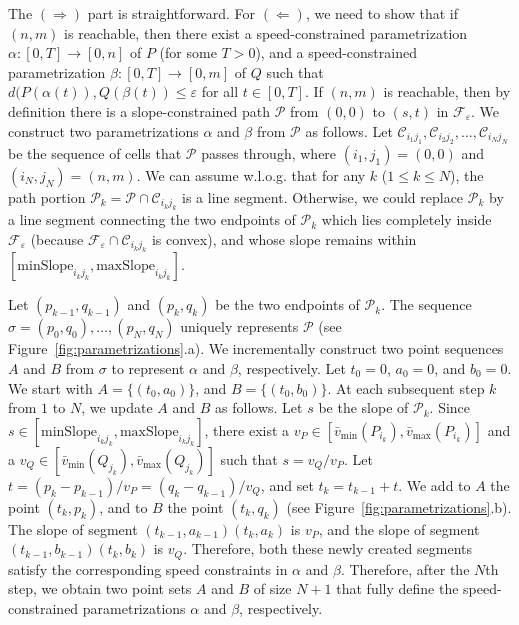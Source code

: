 \documentclass[12pt]{dalthesis}
\def\favoritefont{\bfseries \sffamily}
\def\QED{\ensuremath{{\Box}}}
\def\markatright#1{\leavevmode\unskip\nobreak\quad\hspace*{\fill}{#1}}
\newenvironment{proof}
	{\begin{trivlist}\item[\hskip\labelsep{\favoritefont Proof:}]}
	{\markatright{\QED}\end{trivlist}}
\newcommand{\lee}{\leqslant}
\newcommand{\set}[1]{{\{ #1 \}}}
\newcommand{\eps}{\varepsilon}
\newcommand{\CF}{{\mathscr F}}
\newcommand{\CP}{{\mathscr P}}
\newcommand{\CC}{{\mathscr C}}
\newcommand{\cell}[1]{{\CC_{#1}}}
\newcommand{\Feps}{\CF_\eps}
\newcommand{\Xmin}[2]{{#1}_{\min}(#2)}
\newcommand{\Xmax}[2]{{#1}_{\max}(#2)}
\newcommand{\umin}[1]{\Xmin{\bar{v}}{#1}}
\newcommand{\umax}[1]{\Xmax{\bar{v}}{#1}}
\newcommand{\minS}[1]{\mbox{minSlope}_{#1}}
\newcommand{\maxS}[1]{\mbox{maxSlope}_{#1}}
\begin{document}
\begin{proof}
	The $(\Rightarrow)$ part is straightforward. 
	For $(\Leftarrow)$,
	we need to show that if $(n,m)$ is reachable, then  there exist a speed-constrained parametrization
	$\alpha:[0,T] \rightarrow [0,n]$ of $P$ (for some $T>0$), 
	and  a speed-constrained parametrization 
	$\beta:[0,T] \rightarrow [0,m]$ of $Q$ such that
	$d( P(\alpha(t)), Q(\beta(t) ) \lee \eps$ for all $t \in [0,T]$.
	If $(n,m)$ is reachable, then by definition there is a
	slope-constrained path $\CP$ from $(0,0)$ to $(s,t)$ in $\Feps$.
	We construct two parametrizations $\alpha$ and $\beta$ from $\CP$ as follows.
	Let $\cell{i_1j_1}, \cell{i_2j_2}, \ldots, \cell{i_Nj_N}$ be the sequence of cells 
	that $\CP$ passes through, where $(i_1,j_1) = (0,0)$ and $(i_N,j_N) = (n,m)$.
	We can assume w.l.o.g. that for any $k$ ($1 \lee k \lee N$),
	the path portion $\CP_k = \CP \cap \cell{i_kj_k}$
	is a line segment. Otherwise, we could replace 
	$\CP_k$ by a line segment connecting the two endpoints of $\CP_k$
	which lies completely inside $\Feps$ (because $\Feps \cap \cell{i_{k}j_{k}}$ is convex),
	and whose slope remains within $[\minS{i_{k}j_{k}}, \maxS{i_{k}j_{k}}]$.

	Let $(p_{k-1},q_{k-1})$ and $ (p_k,q_k)$ be the two endpoints of $\CP_k$.
	The sequence $\sigma = (p_0,q_0), \ldots, (p_N,q_N)$ uniquely represents $\CP$
	(see Figure~\ref{fig:parametrizations}.a).
	We incrementally construct two point sequences $A$ and $B$ from $\sigma$ to represent
	$\alpha$ and $\beta$, respectively.
	Let $t_0 = 0$, $a_0 = 0$, and $b_0 = 0$.
	We start with $A = \set{(t_0, a_0)}$, and $B = \set{(t_0, b_0)}$.
	At each subsequent step $k$ from $1$ to $N$, we update $A$ and $B$ as follows.
	Let $s$ be the slope of $\CP_k$.
	Since $s \in [\minS{i_{k}j_{k}}, \maxS{i_{k}j_{k}}]$,
	there exist a $v_P \in [\umin{P_{i_k}},\umax{P_{i_k}}]$
	and a $v_Q \in [\umin{Q_{j_k}},\umax{Q_{j_k}}]$ 
	such that $s = v_Q / v_P$.
	Let $t = (p_k - p_{k-1})/ v_P = (q_k - q_{k-1})/ v_Q$, and set $t_k = t_{k-1}+ t$.
	We add to $A$ the point $(t_k, p_k)$, and to $B$ the point $(t_k, q_k)$
	(see Figure~\ref{fig:parametrizations}.b).
	The slope of  segment $(t_{k-1},a_{k-1})(t_{k},a_{k})$ is $v_P$, and 
	the slope of segment $(t_{k-1},b_{k-1})(t_{k},b_{k})$ is $v_Q$.
	Therefore, both these newly created segments 
	satisfy the corresponding speed constraints in $\alpha$ and $\beta$.
	Therefore, after the $N$th step, we obtain two point sets $A$ and $B$ of size $N+1$
	that fully define the speed-constrained parametrizations $\alpha$ and $\beta$, respectively.
\end{proof}
\end{document}
